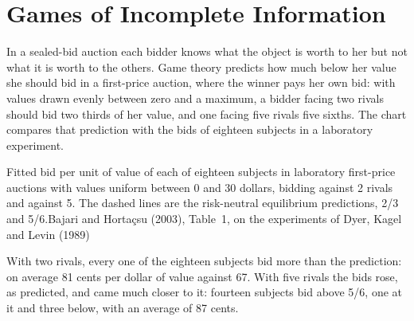 \chapter{Games of Incomplete Information}\label{ch:b2:bayesian-games}

In a sealed-bid auction each bidder knows what the object is worth to her but not what it is worth to the
others. Game theory predicts how much below her value she should bid in a first-price auction, where the
winner pays her own bid: with values drawn evenly between zero and a maximum, a bidder facing two rivals should
bid two thirds of her value, and one facing five rivals five sixths. The chart compares that prediction with
the bids of eighteen subjects in a laboratory experiment.

\begin{openingchart}{Fitted bid per unit of value of each of eighteen subjects in laboratory first-price
  auctions with values uniform between 0 and 30 dollars, bidding against 2 rivals and against 5. The dashed
  lines are the risk-neutral equilibrium predictions, 2/3 and 5/6.}{Bajari and Horta\c{c}su (2003), Table~1,
  on the experiments of Dyer, Kagel and Levin (1989)}
\end{openingchart}

With two rivals, every one of the eighteen subjects bid more than the prediction: on average 81 cents per dollar
of value against 67. With five rivals the bids rose, as predicted, and came much closer to it: fourteen subjects
bid above 5/6, one at it and three below, with an average of 87 cents.


